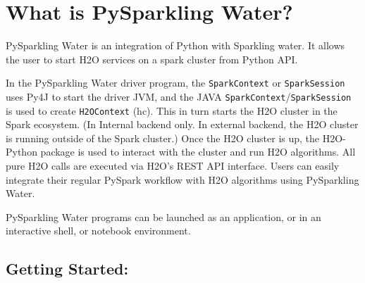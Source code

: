 \section{What is PySparkling Water?}

PySparkling Water is an integration of Python with Sparkling water. It allows the user to start H2O services on a spark cluster from Python API.

In the PySparkling Water driver program, the \texttt{SparkContext} or \texttt{SparkSession} uses Py4J to start the driver JVM, and the JAVA \texttt{SparkContext}/\texttt{SparkSession} is used to create \texttt{H2OContext} (hc). This in turn starts the H2O cluster in the Spark ecosystem. (In Internal backend only. In external backend, the H2O cluster is running outside of the Spark cluster.)
Once the H2O cluster is up, the H2O-Python package is used to interact with the cluster and run H2O algorithms. All pure H2O calls are executed via H2O's REST API interface. Users can easily integrate their regular PySpark workflow with H2O algorithms using PySparkling Water.

PySparkling Water programs can be launched as an application, or in an interactive shell, or notebook environment.

\subsection{Getting Started:}

